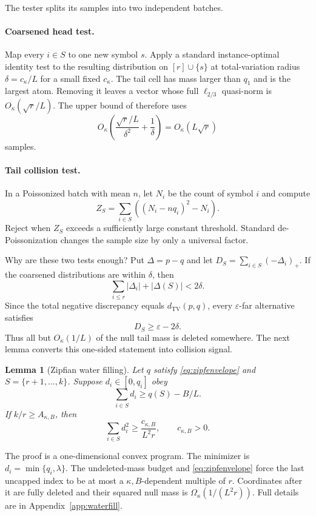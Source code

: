 \documentclass{article}
\newtheorem{lemma}{Lemma}
\newcommand{\TV}{d_{\mathrm{TV}}}
\newcommand{\1}{\mathbf 1}
\begin{document}
The tester splits its samples into two independent batches.

\paragraph{Coarsened head test.}
Map every $i\in S$ to one new symbol $s$. Apply a standard instance-optimal identity test to the resulting distribution on $[r]\cup\{s\}$ at total-variation radius $\delta=c_\kappa/L$ for a small fixed $c_\kappa$. The tail cell has mass larger than $q_1$ and is the largest atom. Removing it leaves a vector whose full $\ell_{2/3}$ quasi-norm is $O_\kappa(\sqrt r/L)$. The upper bound of \citet{valiant2017automatic} therefore uses \[ O_\kappa\left(\frac{\sqrt r/L}{\delta^2}+\frac1\delta\right) =O_\kappa(L\sqrt r) \tag{6}\label{eq:headcost} \] samples.

\paragraph{Tail collision test.}
In a Poissonized batch with mean $n$, let $N_i$ be the count of symbol $i$ and compute \[ Z_S=\sum_{i\in S}\left((N_i-nq_i)^2-N_i\right). \tag{7}\label{eq:collision} \] Reject when $Z_S$ exceeds a sufficiently large constant threshold. Standard de-Poissonization changes the sample size by only a universal factor.

Why are these two tests enough? Put $\Delta=p-q$ and let $D_S=\sum_{i\in S}(-\Delta_i)_+$. If the coarsened distributions are within $\delta$, then \[ \sum_{i\leq r}|\Delta_i|+|\Delta(S)|<2\delta. \] Since the total negative discrepancy equals $\TV(p,q)$, every $\varepsilon$-far alternative satisfies \[ D_S\geq\varepsilon-2\delta. \tag{8}\label{eq:deleted} \] Thus all but $O_\kappa(1/L)$ of the null tail mass is deleted somewhere. The next lemma converts this one-sided statement into collision signal.

\begin{lemma}[Zipfian water filling]
\label{lem:waterfill}
Let $q$ satisfy \eqref{eq:zipfenvelope} and $S=\{r+1,\ldots,k\}$. Suppose $d_i\in[0,q_i]$ obey \[ \sum_{i\in S}d_i\geq q(S)-B/L. \] If $k/r\geq A_{\kappa,B}$, then \[ \sum_{i\in S}d_i^2\geq \frac{c_{\kappa,B}}{L^2r}, \qquad c_{\kappa,B}>0. \tag{9}\label{eq:waterfill} \]
\end{lemma}

The proof is a one-dimensional convex program. The minimizer is $d_i=\min\{q_i,\lambda\}$. The undeleted-mass budget and \eqref{eq:zipfenvelope} force the last uncapped index to be at most a $\kappa,B$-dependent multiple of $r$. Coordinates after it are fully deleted and their squared null mass is $\Omega_\kappa(1/(L^2r))$. Full details are in Appendix~\ref{app:waterfill}.
\end{document}
